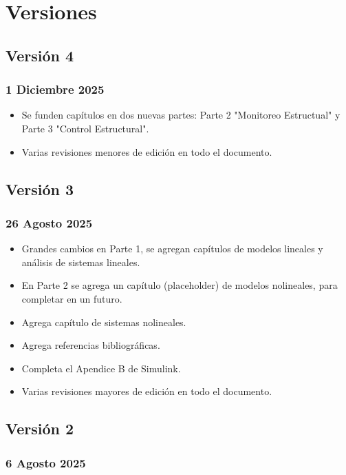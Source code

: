 \chapter*{Versiones}

\section*{Versión 4}
\subsection*{1 Diciembre 2025}

\begin{itemize}
    \item Se funden capítulos en dos nuevas partes: Parte 2 "Monitoreo Estructual" y Parte 3 "Control Estructural".
    \item Varias revisiones menores de edición en todo el documento.
\end{itemize}

\section*{Versión 3}
\subsection*{26 Agosto 2025}

\begin{itemize}
    \item Grandes cambios en Parte 1, se agregan capítulos de modelos lineales y análisis de sistemas lineales. 
    \item En Parte 2 se agrega un capítulo (placeholder) de modelos nolineales, para completar en un futuro.
    \item Agrega capítulo de sistemas nolineales.
    \item Agrega referencias bibliográficas.
    \item Completa el Apendice B de Simulink.
    \item Varias revisiones mayores de edición en todo el documento.
\end{itemize}

\section*{Versión 2}
\subsection*{6 Agosto 2025}

